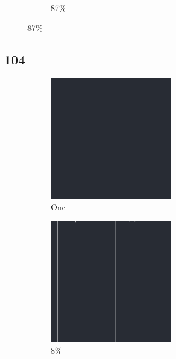 \documentclass[12pt, fleqn]{report}                             %
\theoremstyle{break}                                            %
\begin{document}
\begin{figure}[ht!]
\begin{subfigure}[b]{0.4\linewidth}
          \caption{87\%}
        \end{subfigure}
      \end{figure}


      \clearpage
      \subsection{104}
      \begin{figure}[ht!]
        \centering
        \begin{subfigure}[b]{0.4\linewidth}
          \includegraphics[width=0.6\textwidth]{Images/104/a.png}
          \caption{One}
        \end{subfigure}
        \begin{subfigure}[b]{0.4\linewidth}
          \includegraphics[width=0.6\textwidth]{Images/104/b.png}
          \caption{8\%}
        \end{subfigure}
        \begin{subfigure}[b]{0.4\linewidth}

\end{subfigure}
\end{figure}
\end{document}
